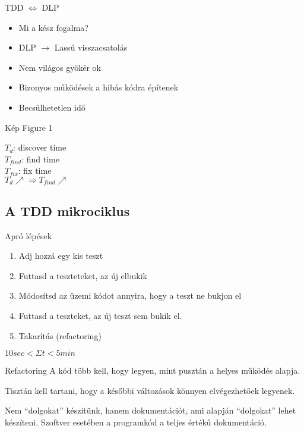 \begin{frame}{TDD $\Leftrightarrow$ DLP}
  \begin{itemize}[<+->]
  \item Mi a kész fogalma?
  \item DLP $\rightarrow$ Lassú visszacsatolás
  \item Nem világos gyökér ok
  \item Bizonyos működések a hibás kódra építenek
  \item Becsülhetetlen idő
  \end{itemize}
\end{frame}

\begin{frame}{Kép}
  Figure 1

  $T_d$: discover time \\
  $T_{find}$: find time \\
  $T_{fix}$: fix time \\
  $T_d \nearrow \Rightarrow T_{find} \nearrow$
\end{frame}

\subsection{A TDD mikrociklus}
\begin{frame}{Apró lépések}
  \begin{enumerate}[<+->]
  \item Adj hozzá egy kis teszt
  \item Futtasd a teszteteket, az új elbukik
  \item Módosítsd az üzemi kódot annyira, hogy a teszt ne bukjon el
  \item Futtasd a teszteket, az új teszt sem bukik el.
  \item Takarítás (refactoring)
  \end{enumerate}

  \pause
  $10 sec < \Sigma t < 5 min$
\end{frame}

\begin{frame}{Refactoring}
  A kód több kell, hogy legyen, mint pusztán a helyes működés alapja.

  \pause

  Tisztán kell tartani, hogy a későbbi változások könnyen elvégezhetőek legyenek.

  \pause

  Nem ``dolgokat'' készítünk, hanem dokumentációt, ami alapján
  ``dolgokat'' lehet készíteni. Szoftver esetében a programkód a
  teljes értékű dokumentáció.
\end{frame}

